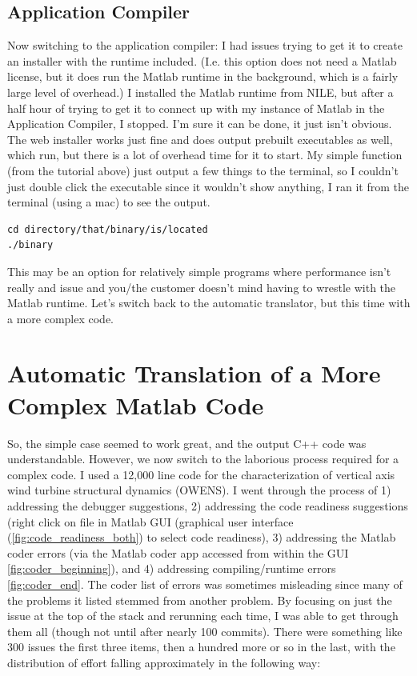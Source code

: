 \documentclass{article}
\begin{document}
\subsection{Application Compiler}
Now switching to the application compiler: I had issues trying to get it to create an installer with the runtime included. (I.e. this option does not need a Matlab license, but it does run the Matlab runtime in the background, which is a fairly large level of overhead.) I installed the Matlab runtime from NILE, but after a half hour of trying to get it to connect up with my instance of Matlab in the Application Compiler, I stopped. I'm sure it can be done, it just isn't obvious. The web installer works just fine and does output prebuilt executables as well, which run, but there is a lot of overhead time for it to start. My simple function (from the tutorial above) just output a few things to the terminal, so I couldn't just double click the executable since it wouldn't show anything, I ran it from the terminal (using a mac) to see the output.

\begin{verbatim}
cd directory/that/binary/is/located
./binary
\end{verbatim}

This may be an option for relatively simple programs where performance isn't really and issue and you/the customer doesn't mind having to wrestle with the Matlab runtime.  Let's switch back to the automatic translator, but this time with a more complex code.

\section{Automatic Translation of a More Complex Matlab Code}

So, the simple case seemed to work great, and the output C++ code was understandable.  However, we now switch to the laborious process required for a complex code.  I used a 12,000 line code for the characterization of vertical axis wind turbine structural dynamics (OWENS).  I went through the process of 1) addressing the debugger suggestions, 2) addressing the code readiness suggestions (right click on file in Matlab GUI (graphical user interface (\cref{fig:code_readiness_both}) to select code readiness), 3) addressing the Matlab coder errors (via the Matlab coder app accessed from within the GUI \cref{fig:coder_beginning}), and 4) addressing compiling/runtime errors \cref{fig:coder_end}.  The coder list of errors was sometimes misleading since many of the problems it listed stemmed from another problem.  By focusing on just the issue at the top of the stack and rerunning each time, I was able to get through them all (though not until after nearly 100 commits).  There were something like 300 issues the first three items, then a hundred more or so in the last, with the distribution of effort falling approximately in the following way:
\end{document}

